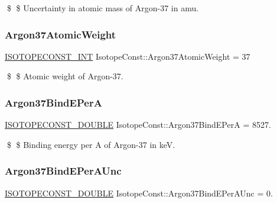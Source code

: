 \$ \$ Uncertainty in atomic mass of Argon-\/37 in amu. \mbox{\label{group___isotope_const-_argon-_ar37_ga503edef1d754bc66a9adc20fc96fa585}} 
\subsubsection{\texorpdfstring{Argon37\+Atomic\+Weight}{Argon37AtomicWeight}}
{\footnotesize\ttfamily \mbox{\hyperlink{group___isotope_const-_macros_ga5f18360b3e99483a35c32d789e62621c}{I\+S\+O\+T\+O\+P\+E\+C\+O\+N\+S\+T\+\_\+\+I\+NT}} Isotope\+Const\+::\+Argon37\+Atomic\+Weight = 37}

\$ \$ Atomic weight of Argon-\/37. \mbox{\label{group___isotope_const-_argon-_ar37_ga23c7bcb97962182a63772fdcdca83f81}} 
\subsubsection{\texorpdfstring{Argon37\+Bind\+E\+PerA}{Argon37BindEPerA}}
{\footnotesize\ttfamily \mbox{\hyperlink{group___isotope_const-_macros_ga8f45a7272ce02c0b4c65c44636ed719a}{I\+S\+O\+T\+O\+P\+E\+C\+O\+N\+S\+T\+\_\+\+D\+O\+U\+B\+LE}} Isotope\+Const\+::\+Argon37\+Bind\+E\+PerA = 8527.}

\$ \$ Binding energy per A of Argon-\/37 in keV. \mbox{\label{group___isotope_const-_argon-_ar37_gacded8c899ea62428fec5420ecbd4f629}} 
\subsubsection{\texorpdfstring{Argon37\+Bind\+E\+Per\+A\+Unc}{Argon37BindEPerAUnc}}
{\footnotesize\ttfamily \mbox{\hyperlink{group___isotope_const-_macros_ga8f45a7272ce02c0b4c65c44636ed719a}{I\+S\+O\+T\+O\+P\+E\+C\+O\+N\+S\+T\+\_\+\+D\+O\+U\+B\+LE}} Isotope\+Const\+::\+Argon37\+Bind\+E\+Per\+A\+Unc = 0.}

